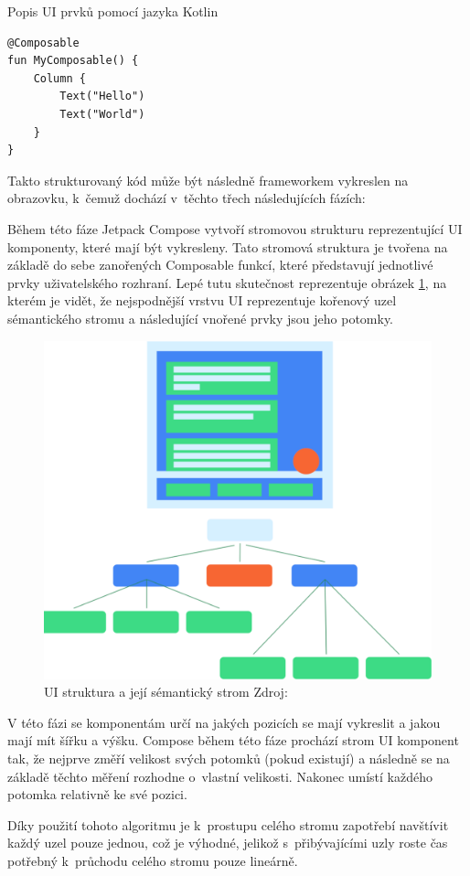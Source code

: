 \begin{listing}[H]
\caption{Popis UI prvků pomocí jazyka Kotlin}\label{lst:ComposeCode}
\begin{verbatim}
@Composable
fun MyComposable() {
    Column {
        Text("Hello")
        Text("World")
    }
}
\end{verbatim}
\end{listing}

Takto strukturovaný kód může být následně frameworkem vykreslen na obrazovku, k~čemuž dochází v~těchto třech následujících fázích:

Během této fáze Jetpack Compose vytvoří stromovou strukturu reprezentující UI komponenty, které mají být vykresleny.\cite{jetpackPhases} 
Tato stromová struktura je tvořena na základě do sebe zanořených Composable funkcí, které představují jednotlivé prvky uživatelského rozhraní.
Lepé tutu skutečnost reprezentuje obrázek \ref{fig:semantics-ui-tree}, na kterém je vidět, že nejspodnější vrstvu UI reprezentuje kořenový uzel
sémantického stromu a následující vnořené prvky jsou jeho potomky.

\begin{figure}[H]
  \centering
  \includegraphics[width=.5\textwidth]{semantics-ui-tree.png}
  \caption{UI struktura a její sémantický strom Zdroj: \cite{imgSemantics}}
  \label{fig:semantics-ui-tree}
\end{figure}

V této fázi se komponentám určí na jakých pozicích se mají vykreslit a jakou mají mít šířku a výšku.
Compose během této fáze prochází strom UI komponent tak, že nejprve změří velikost svých potomků (pokud existují) a následně se 
na základě těchto měření rozhodne o~vlastní velikosti. Nakonec umístí každého potomka relativně ke své pozici.\cite{jetpackPhases}

Díky použití tohoto algoritmu je k~prostupu celého stromu zapotřebí navštívit každý uzel pouze jednou, což je výhodné, jelikož
s~přibývajícími uzly roste čas potřebný k~průchodu celého stromu pouze lineárně. \cite{jetpackPhases}

